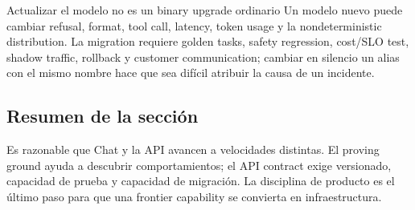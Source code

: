 
\begin{warningbox}{Actualizar el modelo no es un binary upgrade ordinario}
Un modelo nuevo puede cambiar refusal, format, tool call, latency, token usage y la nondeterministic distribution. La migration requiere golden tasks, safety regression, cost/SLO test, shadow traffic, rollback y customer communication; cambiar en silencio un alias con el mismo nombre hace que sea difícil atribuir la causa de un incidente.
\end{warningbox}

\subsection{Resumen de la sección}

Es razonable que Chat y la API avancen a velocidades distintas. El proving ground ayuda a descubrir comportamientos; el API contract exige versionado, capacidad de prueba y capacidad de migración. La disciplina de producto es el último paso para que una frontier capability se convierta en infraestructura.
